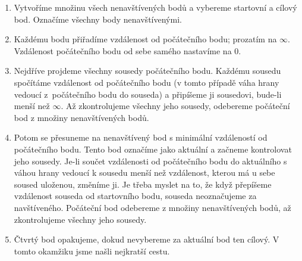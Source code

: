 \begin{enumerate}
    \item Vytvoříme množinu všech nenavštívených bodů a vybereme startovní a cílový bod. Označíme všechny body nenavštívenými. 
    \item Každému bodu přiřadíme vzdálenost od počátečního bodu; prozatím na $\infty$. Vzdálenost počátečního bodu od sebe samého nastavíme na $0$. 
    \item Nejdříve projdeme všechny sousedy počátečního bodu. Každému sousedu spočítáme vzdálenost od počátečního bodu (v tomto případě váha hrany vedoucí z~počátečního bodu do souseda) a připíšeme ji sousedovi, bude-li menší než $\infty$. Až zkontrolujeme všechny jeho sousedy, odebereme počáteční bod z množiny nenavštívených bodů.
    \item Potom se přesuneme na nenavštívený bod s minimální vzdáleností od počátečního bodu. 
    Tento bod označíme jako aktuální a začneme kontrolovat jeho sousedy. 
    Je-li součet vzdálenosti od počátečního bodu do aktuálního s váhou hrany vedoucí k sousedu menší než vzdálenost, kterou má u sebe soused uloženou, změníme ji.
    Je třeba myslet na to, že když přepíšeme vzdálenost souseda od startovního bodu, souseda neoznačujeme za navštíveného. Počáteční bod odebereme z množiny nenavštívených bodů, až zkontrolujeme všechny jeho sousedy.
    \item Čtvrtý bod opakujeme, dokud nevybereme za aktuální bod ten cílový. V tomto okamžiku jsme našli nejkratší cestu.
\end{enumerate}